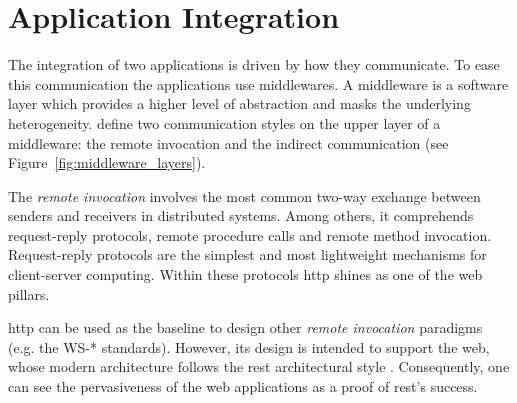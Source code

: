 \section{Application Integration}
\label{sec:soa_integration}

%
%


The integration of two applications is driven by how they communicate.
To ease this communication the applications use middlewares.
A middleware is a software layer which provides a higher level of abstraction and masks the underlying heterogeneity.
\citet{coulouris_distributed_2012} define two communication styles on the upper layer of a middleware: %
the remote invocation and the indirect communication (see Figure~\ref{fig:middleware_layers}).



\medskip

The \emph{remote invocation} involves the most common two-way exchange between senders and receivers in distributed systems.
Among others, it comprehends request-reply protocols, remote procedure calls and remote method invocation.
Request-reply protocols are the simplest and most lightweight mechanisms for client-server computing. %
Within these protocols \ac{http} shines as one of the web pillars.


\ac{http} can be used as the baseline to design other \emph{remote invocation} paradigms (e.g. the WS-* \citep{alonso_web_2010} standards).
However, its design is intended to support the web, whose modern architecture follows the \ac{rest} architectural style \citep{fielding_architectural_2000}.
Consequently, one can see the pervasiveness of the web applications as a proof of \ac{rest}'s success.

